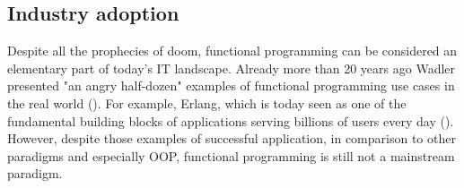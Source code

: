 \subsection{Industry adoption}

Despite all the prophecies of doom, functional programming can be considered an elementary part of today's IT landscape. Already more than 20 years ago Wadler presented "an angry half-dozen" examples of functional programming use cases in the real world (\cite[25]{wadler_functional_1997}). For example, Erlang, which is today seen as one of the fundamental building blocks of applications serving billions of users every day (\cite{reed_thats_2014}). However, despite those examples of successful application, in comparison to other paradigms and especially OOP, functional programming is still not a mainstream paradigm.

